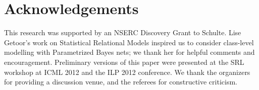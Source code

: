 \documentclass[oribibl]{llncs}
\begin{document}
\section*{Acknowledgements} This research was supported by an NSERC Discovery Grant to Schulte. Lise Getoor's work on Statistical Relational Models inspired us to consider class-level modelling with Parametrized Bayes nets; we thank her for helpful comments and encouragement.  Preliminary versions of this paper were presented at the SRL workshop at ICML 2012 and the ILP 2012 conference. We thank the organizers for providing a discussion venue, and the referees for constructive criticism.
%
\end{document}
